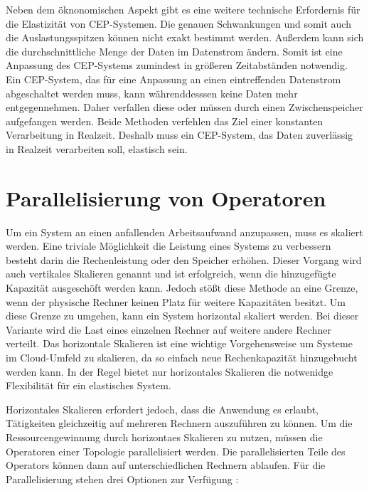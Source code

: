 Neben dem öknonomischen Aspekt gibt es eine weitere technische Erfordernis für die Elastizität von CEP-Systemen.
Die genauen Schwankungen und somit auch die Auslastungsspitzen können nicht exakt bestimmt werden.
Außerdem kann sich die durchschnittliche Menge der Daten im Datenstrom ändern.
Somit ist eine Anpassung des CEP-Systems zumindest in größeren Zeitabständen notwendig.
Ein CEP-System, das für eine Anpassung an einen eintreffenden Datenstrom abgeschaltet werden muss, kann währenddesssen keine Daten mehr entgegennehmen.
Daher verfallen diese oder müssen durch einen Zwischenspeicher aufgefangen werden.
Beide Methoden verfehlen das Ziel einer konstanten Verarbeitung in Realzeit.
Deshalb muss ein CEP-System, das Daten zuverlässig in Realzeit verarbeiten soll, elastisch sein.

\section{Parallelisierung von Operatoren}

Um ein System an einen anfallenden Arbeitsaufwand anzupassen, muss es skaliert werden.
Eine triviale Möglichkeit die Leistung eines Systems zu verbessern besteht darin die Rechenleistung oder den Speicher erhöhen.
Dieser Vorgang wird auch vertikales Skalieren genannt und ist erfolgreich, wenn die hinzugefügte Kapazität ausgeschöft werden kann.
Jedoch stößt diese Methode an eine Grenze, wenn der physische Rechner keinen Platz für weitere Kapazitäten besitzt.
Um diese Grenze zu umgehen, kann ein System horizontal skaliert werden.
Bei dieser Variante wird die Last eines einzelnen Rechner auf weitere andere Rechner verteilt.
Das horizontale Skalieren ist eine wichtige Vorgehensweise um Systeme im Cloud-Umfeld zu skalieren, da so einfach neue Rechenkapazität hinzugebucht werden kann.
In der Regel bietet nur horizontales Skalieren die notwenidge Flexibilität für ein elastisches System.

Horizontales Skalieren erfordert jedoch, dass die Anwendung es erlaubt, Tätigkeiten gleichzeitig auf mehreren Rechnern auszuführen zu können.
Um die Ressourcengewinnung durch horizontaes Skalieren zu nutzen, müssen die Operatoren einer Topologie parallelisiert werden.
Die parallelisierten Teile des Operators können dann auf unterschiedlichen Rechnern ablaufen.
Für die Parallelisierung stehen drei Optionen zur Verfügung \cite{de_assuncao_distributed_2017}:


